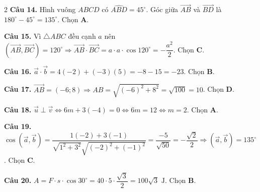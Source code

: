 \documentclass[10pt,a4paper]{article}
\begin{document}
\begin{multicols}{2}
\textbf{Câu 14.} Hình vuông $ABCD$ có $\widehat{ABD} = 45^\circ$. Góc giữa $\vec{AB}$ và $\vec{BD}$ là $180^\circ - 45^\circ = 135^\circ$. Chọn \textbf{A}.

\textbf{Câu 15.} Vì $\triangle ABC$ đều cạnh $a$ nên $(\vec{AB}, \vec{BC}) = 120^\circ \Rightarrow \vec{AB} \cdot \vec{BC} = a \cdot a \cdot \cos 120^\circ = -\dfrac{a^2}{2}$. Chọn \textbf{C}.

\textbf{Câu 16.} $\vec{a} \cdot \vec{b} = 4(-2) + (-3)(5) = -8 - 15 = -23$. Chọn \textbf{B}.

\textbf{Câu 17.} $\vec{AB} = (-6; 8) \Rightarrow AB = \sqrt{(-6)^2 + 8^2} = \sqrt{100} = 10$. Chọn \textbf{D}.

\textbf{Câu 18.} $\vec{u} \perp \vec{v} \Leftrightarrow 6m + 3(-4) = 0 \Leftrightarrow 6m = 12 \Leftrightarrow m = 2$. Chọn \textbf{A}.

\textbf{Câu 19.} $\cos(\vec{a}, \vec{b}) = \dfrac{1(-2) + 3(-1)}{\sqrt{1^2+3^2}\sqrt{(-2)^2+(-1)^2}} = \dfrac{-5}{\sqrt{50}} = -\dfrac{\sqrt{2}}{2} \Rightarrow (\vec{a}, \vec{b}) = 135^\circ$. Chọn \textbf{C}.

\textbf{Câu 20.} $A = F \cdot s \cdot \cos 30^\circ = 40 \cdot 5 \cdot \dfrac{\sqrt{3}}{2} = 100\sqrt{3}\text{ J}$. Chọn \textbf{B}.

\end{multicols}
\newpage
\end{document}

